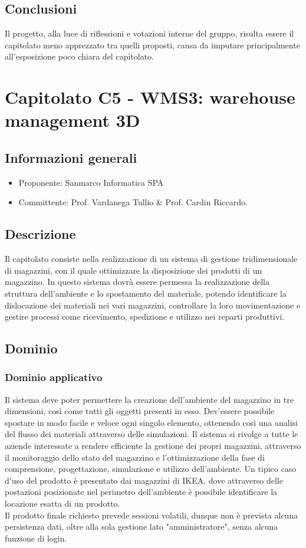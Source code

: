 \documentclass[12pt]{report}
\begin{document}
\section{Conclusioni}
Il progetto, alla luce di riflessioni e votazioni interne del gruppo, risulta essere il capitolato meno apprezzato tra quelli proposti, causa da imputare principalmente all'esposizione poco chiara del capitolato.

\chapter{Capitolato C5 - WMS3: warehouse management 3D}\label{chapter:5}
\section{Informazioni generali}
\begin{itemize}
    \item Proponente: Sanmarco Informatica SPA
    \item Committente: Prof. Vardanega Tullio \& Prof. Cardin Riccardo.
\end{itemize}

\section{Descrizione}
Il capitolato consiste nella realizzazione di un sistema di gestione tridimensionale di magazzini, con il quale ottimizzare la disposizione dei prodotti di un magazzino. In questo sistema dovrà essere permessa la realizzazione della struttura dell'ambiente e lo spostamento del materiale, potendo identificare la dislocazione dei materiali nei vari magazzini, controllare la loro movimentazione e gestire processi come ricevimento, spedizione e utilizzo nei reparti produttivi.

\section{Dominio}
\subsection{Dominio applicativo}
Il sistema deve poter permettere la creazione dell'ambiente del magazzino in tre dimensioni, così come tutti gli oggetti presenti in esso. Dev'essere possibile spostare in modo facile e veloce ogni singolo elemento, ottenendo così una analisi del flusso dei materiali attraverso delle simulazioni. Il sistema si rivolge a tutte le aziende interessate a rendere efficiente la gestione dei propri magazzini, attraverso il monitoraggio dello stato del magazzino e l'ottimizzazione della fase di comprensione, progettazione, simulazione e utilizzo dell'ambiente. Un tipico caso d'uso del prodotto è presentato dai magazzini di IKEA, dove attraverso delle postazioni posizionate nel perimetro dell'ambiente è possibile identificare la locazione esatta di un prodotto.\\
Il prodotto finale richiesto prevede sessioni volatili, dunque non è prevista alcuna persistenza dati, oltre alla sola gestione lato "amministratore", senza alcuna funzione di login.
\end{document}
